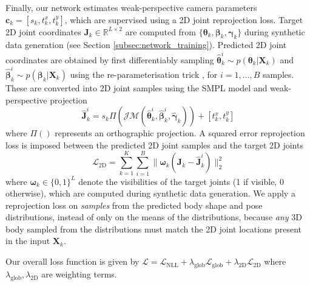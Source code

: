 \documentclass[final]{cvpr}
\begin{document}
Finally, our network estimates weak-perspective camera parameters $\mathbf{c}_k = [s_k, t^x_k, t^y_k]$, which are supervised using a 2D joint reprojection loss. Target 2D joint coordinates $\mathbf{J}_{k} \in \mathbb{R}^{L \times 2}$ are computed from $\{\boldsymbol{\theta}_k, \boldsymbol{\beta}_k,\boldsymbol{\gamma}_k\}$ during synthetic data generation (see Section \ref{subsec:network_training}). Predicted 2D joint coordinates are obtained by first differentiably sampling $\boldsymbol{\hat{\theta}}_k^i \sim p(\boldsymbol{\theta}_k |\mathbf{X}_k)$ and  $\boldsymbol{\hat{\beta}}_k^i \sim p(\boldsymbol{\beta}_k |\mathbf{X}_k)$ using the re-parameterisation trick \cite{kingma2014autoencoding}, for $i=1,...,B$ samples. These are converted into 2D joint samples using the SMPL model and weak-perspective projection
\begin{equation}
\mathbf{\hat{J}}_k^i = s_k \Pi(\mathcal{J}\mathcal{M}(\boldsymbol{\hat{\theta}}_k^i, \boldsymbol{\hat{\beta}}_k^i, \boldsymbol{\hat{\gamma}}_k)) + [t^x_k, t^y_k]
\end{equation}
where $\Pi()$ represents an orthographic projection. A squared error reprojection loss is imposed between the predicted 2D joint samples and the target 2D joints
\begin{equation}
\mathcal{L}_\text{2D} = \sum_{k=1}^{K} \sum_{i=1}^{B} \|\boldsymbol{\omega}_k(\mathbf{J}_k - \mathbf{\hat{J}}_k^i)\|_2^2
\label{eqn:2d_loss}
\end{equation}
where $\boldsymbol{\omega}_k \in \{0,1\}^L$ denote the visibilities of the target joints (1 if visible, 0 otherwise), which are computed during synthetic data generation. We apply a reprojection loss on \textit{samples} from the predicted body shape and pose distributions, instead of only on the means of the distributions, because \textit{any} 3D body sampled from the distributions must match the 2D joint locations present in the input $\mathbf{X}_k$.

Our overall loss function is given by $\mathcal{L} = \mathcal{L}_\text{NLL} + \lambda_\text{glob} \mathcal{L}_\text{glob} + \lambda_\text{2D} \mathcal{L}_\text{2D}$ where $\lambda_\text{glob}, \lambda_\text{2D}$ are weighting terms.
\end{document}
